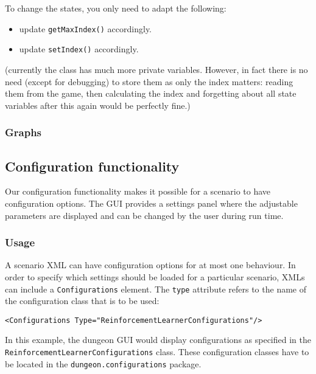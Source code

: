 \documentclass[a4paper,10pt]{scrartcl}
\begin{document}
To change the states, you only need to adapt the following:
\begin{itemize}
 \item update \verb|getMaxIndex()| accordingly.
 \item update \verb|setIndex()| accordingly.
\end{itemize}

(currently the class has much more private variables. However, in fact there is no need (except for debugging) to store them as only the index matters: reading them from the game, then calculating the index and forgetting about all state variables after this again would be perfectly fine.)


\subsubsection{Graphs}

\subsection{Configuration functionality}
Our configuration functionality makes it possible for a scenario to have configuration options. The GUI provides a settings panel where the adjustable parameters are displayed and can be changed by the user during run time.

\subsubsection{Usage}
A scenario XML can have configuration options for at most one behaviour. In order to specify which settings should be loaded for a particular scenario, XMLs can include a \verb|Configurations| element. The \verb|type| attribute refers to the name of the configuration class that is to be used:
\begin{verbatim}
<Configurations Type="ReinforcementLearnerConfigurations"/>
\end{verbatim}
In this example, the dungeon GUI would display configurations as specified in the  \verb|ReinforcementLearnerConfigurations| class. These configuration classes have to be located in the \verb|dungeon.configurations| package.
\end{document}
